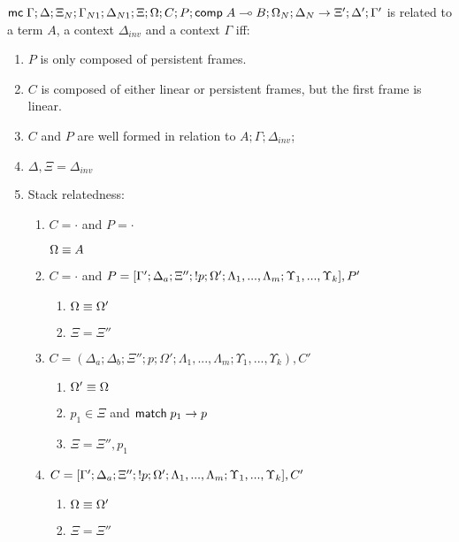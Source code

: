 \begin{definition}
$\mathsf{mc} \; \Gamma; \Delta; \Xi_N; \Gamma_{N1}; \Delta_{N1}; \Xi; \Omega; C; P; \mathsf{comp} \; A \multimap B; \Omega_N; \Delta_N \rightarrow \Xi'; \Delta'; \Gamma'$ is related to a term $A$, a context $\Delta_{inv}$ and a context $\Gamma$ iff:

\begin{enumerate}
   \item $P$ is only composed of persistent frames.
   \item $C$ is composed of either linear or persistent frames, but the first frame is linear.
   \item $C$ and $P$ are well formed in relation to $A; \Gamma; \Delta_{inv}$;
   \item $\Delta, \Xi = \Delta_{inv}$
   \item Stack relatedness:
   \begin{enumerate}
      \item $C = \cdot$ and $P = \cdot$
      
      $\Omega \equiv A$
      
      \item $C = \cdot$ and $P = [\Gamma'; \Delta_a; \Xi''; {!} p; \Omega'; \Lambda_1, ..., \Lambda_m; \Upsilon_1, ..., \Upsilon_k], P'$
      
      \begin{enumerate}
         \item $\Omega \equiv \Omega'$
         \item $\Xi = \Xi''$
      \end{enumerate}
      
      \item $C = (\Delta_a; \Delta_b; \Xi''; p; \Omega'; \Lambda_1, ..., \Lambda_m; \Upsilon_1, ..., \Upsilon_k), C'$
   
      \begin{enumerate}
         \item $\Omega' \equiv \Omega$
         \item $p_1 \in \Xi$ and $\mathsf{match} \; p_1 \rightarrow p$
         \item $\Xi = \Xi'', p_1$
      \end{enumerate}
      \item $C = [\Gamma'; \Delta_a; \Xi''; {!} p; \Omega'; \Lambda_1, ..., \Lambda_m; \Upsilon_1, ..., \Upsilon_k], C'$
      \begin{enumerate}
         \item $\Omega \equiv \Omega'$
         \item $\Xi = \Xi''$
      \end{enumerate}
   \end{enumerate}
      
\end{enumerate}

\end{definition}

